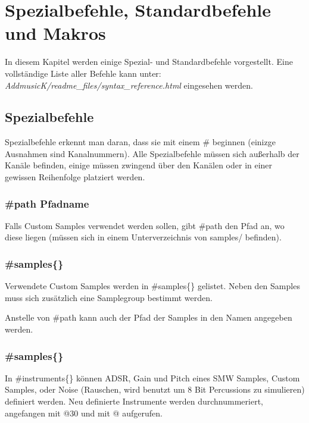 \section{Spezialbefehle, Standardbefehle und Makros}

In diesem Kapitel werden einige Spezial- und Standardbefehle vorgestellt.
Eine vollständige Liste aller Befehle kann unter: \\ \textit{AddmusicK/readme\_files/syntax\_reference.html} eingesehen werden.

\subsection{Spezialbefehle}

Spezialbefehle erkennt man daran, dass sie mit einem \# beginnen (einizge Ausnahmen sind Kanalnummern). Alle Spezialbefehle müssen sich außerhalb der Kanäle befinden, einige müssen zwingend über den Kanälen oder in einer gewissen Reihenfolge platziert werden.


\subsubsection*{\#path \dq Pfadname\dq{}}

Falls Custom Samples verwendet werden sollen, gibt \#path den Pfad an, wo diese liegen (müssen sich in einem Unterverzeichnis von samples/ befinden).

\subsubsection*{\#samples\{\}}

Verwendete Custom Samples werden in \#samples\{\} gelistet. Neben den Samples muss sich zusätzlich eine Samplegroup bestimmt werden.

\medskip



\medskip

Anstelle von \#path kann auch der Pfad der Samples in den Namen angegeben werden.

\subsubsection*{\#samples\{\}}

In \#instruments\{\} können ADSR, Gain und Pitch eines SMW Samples, Custom Samples, oder Noise (Rauschen, wird benutzt um 8 Bit Percussions zu simulieren) definiert werden. Neu definierte Instrumente werden durchnummeriert, angefangen mit @30 und mit @ aufgerufen.

